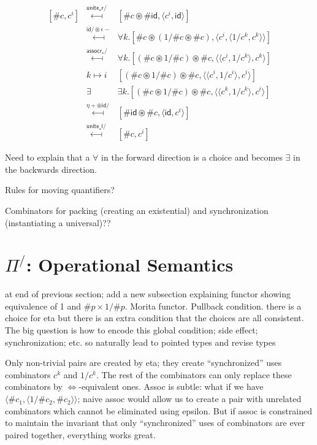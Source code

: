 \documentclass[a4paper,USenglish]{lipics-v2016-utf8x}
\newcommand{\hash}{\#}
\newcommand{\isotwo}{\Leftrightarrow}
\newcommand{\order}[1]{\hash #1}
\newcommand{\iorder}[1]{1/\hash #1}
\newcommand{\unitetl}{\mathsf{{unite_{\star}l}}}
\newcommand{\unitetr}{\mathsf{{unite_{\star}r}}}
\newcommand{\assocrt}{\mathsf{{assocr_{\star}}}}
\newcommand{\idiso}{\mathsf{{id}}}
\begin{document}
\[\begin{array}{rcl}
  [\order{c}, c^i]
&\stackrel{\unitetr/}{\longmapsfrom}&
  [\order{c}\circledast\order{\idiso},
  \langle c^i, \idiso \rangle] \\
&\stackrel{\idiso/\circledast\epsilon-}{\longmapsfrom}&
  \forall{k}.[\order{c}\circledast(\iorder{c}\circledast\order{c}),
  \langle c^i, \langle 1/c^k,c^k \rangle\rangle] \\
&\stackrel{\assocrt/}{\longmapsfrom}&
  \forall{k}.[(\order{c}\circledast\iorder{c})\circledast\order{c},
  \langle \langle c^i,1/c^k \rangle,c^k \rangle] \\
&k\mapsto i&
  [(\order{c}\circledast\iorder{c})\circledast\order{c},
  \langle \langle c^i,1/c^i \rangle,c^i \rangle] \\
&\exists&
  \exists{k}.[(\order{c}\circledast\iorder{c})\circledast\order{c},
  \langle \langle c^k,1/c^k \rangle,c^i \rangle] \\
&\stackrel{\eta+\circledast\idiso/}{\longmapsfrom}&
  [\order{\idiso}\circledast\order{c}, \langle \idiso,c^i\rangle] \\
&\stackrel{\unitetl/}{\longmapsfrom}&
  [\order{c},c^i]
\end{array}\]

Need to explain that a $\forall$ in the forward direction is a choice and
becomes $\exists$ in the backwards direction.

Rules for moving quantifiers?

Combinators for packing (creating an existential) and synchronization
(instantiating a universal)??

\section{$\Pi^/$: Operational Semantics}

at end of previous section; add a new subsection explaining functor showing
equivalence of 1 and $\order{p} \times \iorder{p}$. Morita functor. Pullback condition. there is a
choice for eta but there is an extra condition that the choices are all
consistent. The big question is how to encode this global condition; side
effect; synchronization; etc. so naturally lead to pointed types and revise types

Only non-trivial pairs are created by eta; they create ``synchronized'' uses combinators $c^k$ and $1/c^k$. The rest of the combinators can only replace these combinators by $\isotwo$-equivalent ones. Assoc is subtle: what if we have $\langle \order{c_1} , \langle \iorder{c_2} , \order{c_2} \rangle \rangle$; naive assoc would allow us to create a pair with unrelated combinators which cannot be eliminated using epsilon. But if assoc is constrained to maintain the invariant that only ``synchronized'' uses of combinators are ever paired together, everything works great.
\end{document}
